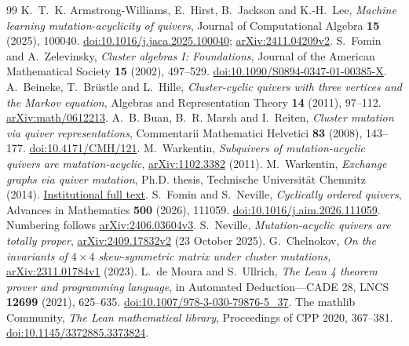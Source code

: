 \documentclass[11pt]{amsart}
\theoremstyle{definition}\newtheorem{definition}[theorem]{Definition}
\theoremstyle{remark}\newtheorem{remark}[theorem]{Remark}
\begin{document}
\begin{thebibliography}{99}
 K.~T.~K. Armstrong-Williams, E.~Hirst, B.~Jackson and K.-H.~Lee,
\emph{Machine learning mutation-acyclicity of quivers}, Journal of Computational Algebra \textbf{15} (2025), 100040. \href{https://doi.org/10.1016/j.jaca.2025.100040}{doi:10.1016/j.jaca.2025.100040}; \href{https://arxiv.org/abs/2411.04209v2}{arXiv:2411.04209v2}.
 S.~Fomin and A.~Zelevinsky, \emph{Cluster algebras I: Foundations}, Journal of the American Mathematical Society \textbf{15} (2002), 497--529. \href{https://doi.org/10.1090/S0894-0347-01-00385-X}{doi:10.1090/S0894-0347-01-00385-X}.
 A.~Beineke, T.~Br\"ustle and L.~Hille, \emph{Cluster-cyclic quivers with three vertices and the Markov equation}, Algebras and Representation Theory \textbf{14} (2011), 97--112. \href{https://arxiv.org/abs/math/0612213}{arXiv:math/0612213}.
 A.~B. Buan, B.~R. Marsh and I.~Reiten, \emph{Cluster mutation via quiver representations}, Commentarii Mathematici Helvetici \textbf{83} (2008), 143--177. \href{https://doi.org/10.4171/CMH/121}{doi:10.4171/CMH/121}.
 M.~Warkentin, \emph{Subquivers of mutation-acyclic quivers are mutation-acyclic}, \href{https://arxiv.org/abs/1102.3382}{arXiv:1102.3382} (2011).
 M.~Warkentin, \emph{Exchange graphs via quiver mutation}, Ph.D. thesis, Technische Universit\"at Chemnitz (2014). \href{https://d-nb.info/1214302807/34}{Institutional full text}.
 S.~Fomin and S.~Neville, \emph{Cyclically ordered quivers}, Advances in Mathematics \textbf{500} (2026), 111059. \href{https://doi.org/10.1016/j.aim.2026.111059}{doi:10.1016/j.aim.2026.111059}. Numbering follows \href{https://arxiv.org/abs/2406.03604v3}{arXiv:2406.03604v3}.
 S.~Neville, \emph{Mutation-acyclic quivers are totally proper}, \href{https://arxiv.org/abs/2409.17832v2}{arXiv:2409.17832v2} (23 October 2025).
 G.~Chelnokov, \emph{On the invariants of $4\times4$ skew-symmetric matrix under cluster mutations}, \href{https://arxiv.org/abs/2311.01784v1}{arXiv:2311.01784v1} (2023).
 L.~de Moura and S.~Ullrich, \emph{The Lean 4 theorem prover and programming language}, in Automated Deduction---CADE 28, LNCS \textbf{12699} (2021), 625--635. \href{https://doi.org/10.1007/978-3-030-79876-5_37}{doi:10.1007/978-3-030-79876-5\_37}.
 The mathlib Community, \emph{The Lean mathematical library}, Proceedings of CPP 2020, 367--381. \href{https://doi.org/10.1145/3372885.3373824}{doi:10.1145/3372885.3373824}.
\end{thebibliography}
\end{document}
